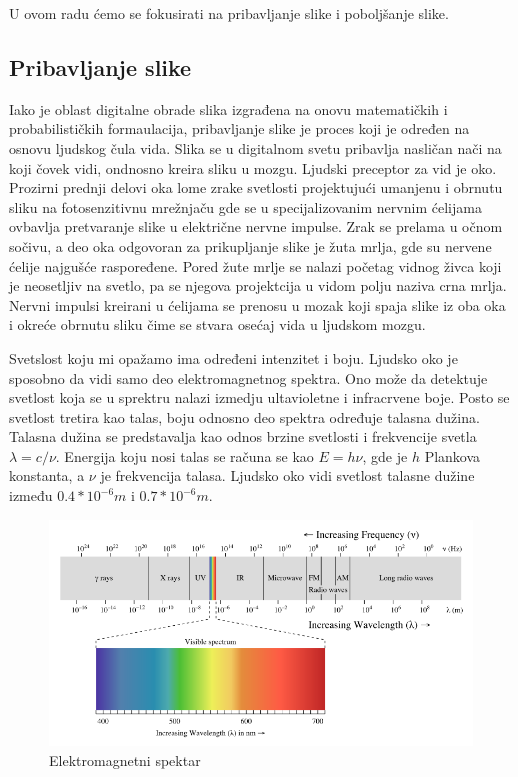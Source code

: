 \documentclass[a4paper,12pt,titlepage]{article}
\begin{document}
U ovom radu ćemo se fokusirati na pribavljanje slike i poboljšanje slike.

\subsection{Pribavljanje slike}%

Iako je oblast digitalne obrade slika izgrađena na onovu matematičkih i probabilističkih formaulacija, pribavljanje slike je proces koji je određen na osnovu ljudskog čula vida. Slika se u digitalnom svetu pribavlja nasličan nači na koji čovek vidi, ondnosno kreira sliku u mozgu. Ljudski preceptor za vid je oko. Prozirni prednji delovi oka lome zrake svetlosti projektujući umanjenu i obrnutu sliku na fotosenzitivnu mrežnjaču gde se u specijalizovanim nervnim ćelijama ovbavlja pretvaranje slike u električne nervne impulse. Zrak se prelama u očnom sočivu, a deo oka odgovoran za prikupljanje slike je žuta mrlja, gde su nervene ćelije najgušće raspoređene. Pored žute mrlje se nalazi početag vidnog živca koji je neosetljiv na svetlo, pa se njegova projektcija u vidom polju naziva crna mrlja. Nervni impulsi kreirani u ćelijama se prenosu u mozak koji spaja slike iz oba oka i okreće obrnutu sliku čime se stvara osećaj vida u ljudskom mozgu.

Svetslost koju mi opažamo ima određeni intenzitet i boju. Ljudsko oko je sposobno da vidi samo deo elektromagnetnog spektra. Ono može da detektuje svetlost koja se u sprektru nalazi izmedju ultavioletne i infracrvene boje. Posto se svetlost tretira kao talas, boju odnosno deo spektra određuje talasna dužina. Talasna dužina se predstavalja kao odnos brzine svetlosti i frekvencije svetla $\lambda = c / \nu$. Energija koju nosi talas se računa se kao $E = h \nu$, gde je $h$ Plankova konstanta, a $\nu$ je frekvencija talasa. Ljudsko oko vidi svetlost talasne dužine između $0.4 * 10^{-6}m$ i $0.7 * 10^{-6}m$.

\begin{figure}[ht!]
\centering
\includegraphics[width=120mm]{img/spektar.png}
\caption{Elektromagnetni spektar}
\label{overflow}
\end{figure} 
\end{document}
